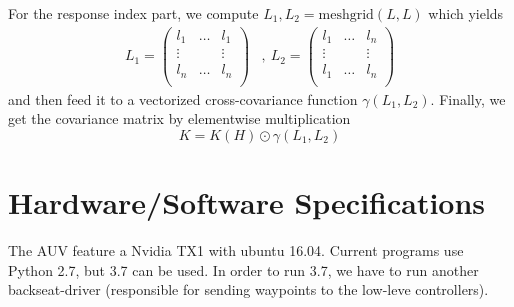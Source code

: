 \documentclass[a4paper,10pt]{article}
\begin{document}
For the response index part, we compute $L_1, L_2=\textrm{meshgrid}\left(L,
L\right)$ which yields
\begin{align*}
    L_1 =  \begin{pmatrix}
        l_1 & \dots & l_1\\
        \vdots &  & \vdots \\
        l_n & \dots & l_n\\
    \end{pmatrix}
    &,~ 
    L_2 =  \begin{pmatrix}
        l_1 & \dots & l_n\\
        \vdots &  & \vdots \\
        l_1 & \dots & l_n\\
    \end{pmatrix}
\end{align*}
and then feed it to a vectorized cross-covariance function $\gamma(L_1, L_2)$.
Finally, we get the covariance matrix by elementwise multiplication
\[
    K = K\left(H\right) \odot \gamma\left(L_1, L_2\right)
\]

\section{Hardware/Software Specifications}
The AUV feature a Nvidia TX1 with ubuntu 16.04. Current programs use Python
2.7, but 3.7 can be used.
In order to run 3.7, we have to run
another backseat-driver (responsible for sending waypoints to the low-leve
controllers).
\end{document}
